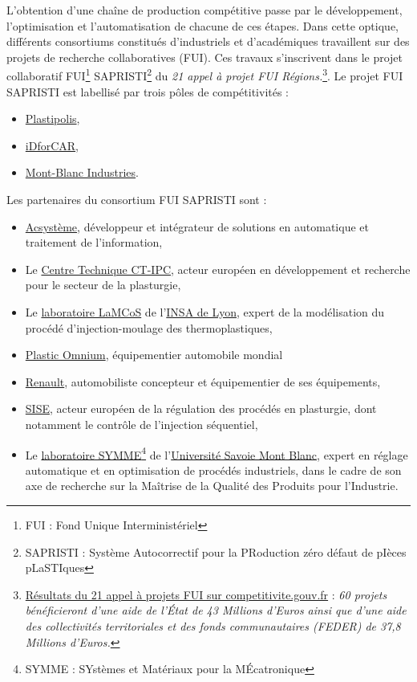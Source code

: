 L’obtention d’une chaîne de production compétitive passe par le développement, l’optimisation et l’automatisation de chacune de ces étapes.
Dans cette optique, différents consortiums constitués d’industriels et d’académiques travaillent sur des projets de recherche collaboratives (FUI).
Ces travaux s'inscrivent dans le projet collaboratif FUI\footnote{FUI : Fond Unique Interministériel} SAPRISTI\footnote{SAPRISTI : Système Autocorrectif pour la PRoduction zéro défaut de pIèces pLaSTIques} du \textit{21 appel à projet FUI Régions.}\footnote{\href{https://competitivite.gouv.fr/les-appels-a-projets-de-r-d-fui/le-21e-appel-a-projets/les-resultats-du-21e-appel-a-projets-787.html}{Résultats du 21 appel à projets FUI sur competitivite.gouv.fr} : \textit{60 projets bénéficieront d’une aide de l’État de 43 Millions d'Euros ainsi que d’une aide des collectivités territoriales et des fonds communautaires (FEDER) de 37,8 Millions d'Euros.}}.
Le projet FUI SAPRISTI est labellisé par trois pôles de compétitivités :
\begin{itemize}
	\item \href{http://www.plastipolis.fr/}{Plastipolis},
	\item \href{https://www.id4car.org}{iDforCAR},
	\item \href{https://www.montblancindustries.com/}{Mont-Blanc Industries}.
\end{itemize}
\noindent
Les partenaires du consortium FUI SAPRISTI sont :
\begin{itemize}
\item \href{http://www.acsysteme.com/}{Acsystème}, développeur et intégrateur de solutions en automatique et traitement de l'information,
\item Le \href{https://ct-ipc.com/}{Centre Technique CT-IPC}, acteur européen en développement et recherche pour le secteur de la plasturgie,
\item Le \href{https://lamcos.insa-lyon.fr/}{laboratoire LaMCoS} de l'\href{https://www.insa-lyon.fr/}{INSA de Lyon}, expert de la modélisation du procédé d'injection-moulage des thermoplastiques,
\item \href{https://www.plasticomnium.com/}{Plastic Omnium}, équipementier automobile mondial
\item \href{https://www.renault.fr/}{Renault}, automobiliste concepteur et équipementier de ses équipements,
\item \href{http://www.sise-plastics.com/}{SISE}, acteur européen de la régulation des procédés en plasturgie, dont notamment le contrôle de l'injection séquentiel,
\item Le \href{http://www.symme.univ-smb.fr/}{laboratoire SYMME}\footnote{SYMME : SYstèmes et Matériaux pour la MÉcatronique} de l'\href{https://www.univ-smb.fr/}{Université Savoie Mont Blanc}, expert en réglage automatique et en optimisation de procédés industriels, dans le cadre de son axe de recherche sur la Maîtrise de la Qualité des Produits pour l'Industrie.
\end{itemize}

